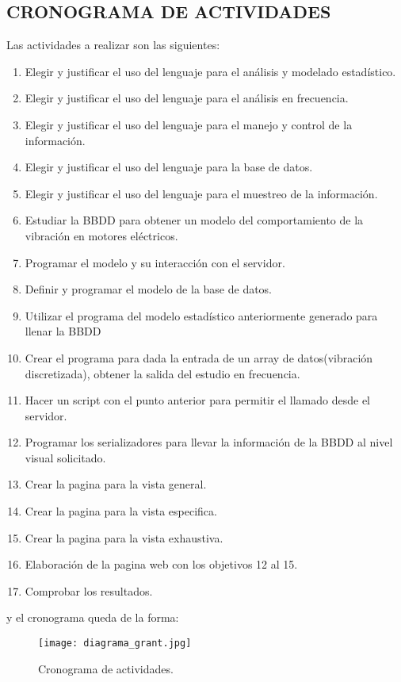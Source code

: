 
\subsection{CRONOGRAMA DE ACTIVIDADES}

	Las actividades a realizar son las siguientes: 


\begin{enumerate}
	\item Elegir y justificar el uso del lenguaje para el análisis y modelado estadístico.
	\item Elegir y justificar el uso del lenguaje para el análisis en frecuencia.
	\item Elegir y justificar el uso del lenguaje para el manejo y control de la información.
	\item Elegir y justificar el uso del lenguaje para la base de datos.
	\item Elegir y justificar el uso del lenguaje para el muestreo de la información.
	\item Estudiar la BBDD para obtener un modelo del comportamiento de la vibración en motores eléctricos.
	\item Programar el modelo y su interacción con el servidor.
	\item Definir y programar el modelo de la base de datos.
	\item Utilizar el programa del modelo estadístico anteriormente generado para llenar la BBDD
	\item Crear el programa para dada la entrada de un array de datos(vibración discretizada), obtener la salida del estudio en frecuencia.
	\item Hacer un script con el punto anterior para permitir el llamado desde el servidor. 
	\item Programar los serializadores para llevar la información de la BBDD al nivel visual solicitado.
	\item Crear la pagina para la vista general.
	\item Crear la pagina para la vista especifica.
	\item Crear la pagina para la vista exhaustiva.
	\item Elaboración de la pagina web con los objetivos 12 al 15.
	\item Comprobar los resultados.
\end{enumerate}


	y el cronograma queda de la forma:\\

	\begin{figure}[htb]
		\centering
		\caption{Cronograma de actividades.}
		\label{cronograma}
		\texttt{[image: diagrama\_grant.jpg]}
	\end{figure}
